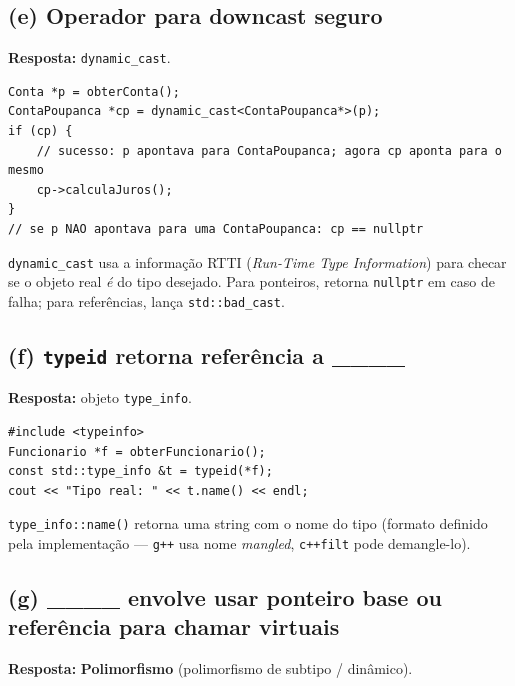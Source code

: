 \documentclass[11pt,a4paper]{article}
\begin{document}
\subsection*{(e) Operador para downcast seguro}

\begin{resposta}\textbf{Resposta:} \texttt{dynamic\_cast}.\end{resposta}

\begin{lstlisting}[style=cppcode,numbers=none]
Conta *p = obterConta();
ContaPoupanca *cp = dynamic_cast<ContaPoupanca*>(p);
if (cp) {
    // sucesso: p apontava para ContaPoupanca; agora cp aponta para o mesmo
    cp->calculaJuros();
}
// se p NAO apontava para uma ContaPoupanca: cp == nullptr
\end{lstlisting}

\texttt{dynamic\_cast} usa a informa\c{c}\~ao RTTI (\emph{Run-Time Type Information}) para checar se o objeto real \emph{\'e} do tipo desejado. Para ponteiros, retorna \texttt{nullptr} em caso de falha; para refer\^encias, lan\c{c}a \texttt{std::bad\_cast}.

\subsection*{(f) \texttt{typeid} retorna refer\^encia a \_\_\_\_}

\begin{resposta}\textbf{Resposta:} objeto \texttt{type\_info}.\end{resposta}

\begin{lstlisting}[style=cppcode,numbers=none]
#include <typeinfo>
Funcionario *f = obterFuncionario();
const std::type_info &t = typeid(*f);
cout << "Tipo real: " << t.name() << endl;
\end{lstlisting}

\texttt{type\_info::name()} retorna uma string com o nome do tipo (formato definido pela implementa\c{c}\~ao --- \texttt{g++} usa nome \emph{mangled}, \texttt{c++filt} pode demangle-lo).

\subsection*{(g) \_\_\_\_ envolve usar ponteiro base ou refer\^encia para chamar virtuais}

\begin{resposta}\textbf{Resposta:} \textbf{Polimorfismo} (polimorfismo de subtipo / din\^amico).\end{resposta}
\end{document}
